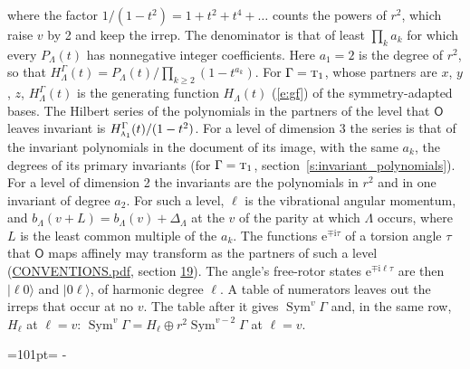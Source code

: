 \documentclass[10pt,a4paper]{article}
\newcommand{\needspace}[1]{\par\penalty-100\begingroup\dimen0=#1\relax\dimen2=\pagegoal
  \advance\dimen2-\pagetotal\ifdim\dimen0>\dimen2\relax\ifdim\dimen2>0pt\vfil\break\fi\fi
  \endgroup}
\numberwithin{equation}{section}
\newcommand{\grp}[1]{\mathsf{#1}}
\newcommand{\irr}[1]{\text{\normalfont\scshape #1}}
\newcommand{\iunit}{\mathrm{i}}
\newcommand{\expe}{\mathrm{e}}
\newcommand{\occ}[1]{\lvert #1\rangle}
\begin{document}
where the factor $1/(1 - t^2) = 1 + t^2 + t^4 + \dots$ counts the powers of $r^2$, which raise $v$ by 2 and keep the irrep. The denominator is that of least $\prod_k a_k$ for which every $P_\Lambda(t)$ has nonnegative integer coefficients. Here $a_1 = 2$ is the degree of $r^2$, so that $H^{\Gamma}_\Lambda(t) = P_\Lambda(t)/\prod_{k\ge2}(1 - t^{a_k})$. For $\Gamma = \irr{t}_{1}$, whose partners are $x$, $y$, $z$, $H^{\Gamma}_\Lambda(t)$ is the generating function $H_\Lambda(t)$ (\ref{e:gf}) of the symmetry-adapted bases. The Hilbert series of the polynomials in the partners of the level that $\grp{O}$ leaves invariant is $H^{\Gamma}_{\irr{a}_{1}}(t)/(1 - t^2)$. For a level of dimension 3 the series is that of the invariant polynomials in the document of its image, with the same $a_k$, the degrees of its primary invariants (for $\Gamma = \irr{t}_{1}$, section~\ref{s:invariant_polynomials}). For a level of dimension 2 the invariants are the polynomials in $r^2$ and in one invariant of degree $a_2$. \label{n:index.overtone.period}\label{n:index.increment.unitary}For such a level, $\ell$ is the vibrational angular momentum, and $b_\Lambda(v + L) = b_\Lambda(v) + \Delta_\Lambda$ at the $v$ of the parity at which $\Lambda$ occurs, where $L$ is the least common multiple of the $a_k$. \label{n:local.torsion.angle}The functions $\expe^{\mp\iunit\tau}$ of a torsion angle $\tau$ that $\grp{O}$ maps affinely may transform as the partners of such a level (\href{../../CONVENTIONS.pdf}{CONVENTIONS.pdf}, section \href{../../CONVENTIONS.pdf\#conv.19}{19}). The angle's free-rotor states $\expe^{\mp\iunit\ell\tau}$ are then $\occ{\ell 0}$ and $\occ{0 \ell}$, of harmonic degree $\ell$. A table of numerators leaves out the irreps that occur at no $v$. The table after it gives $\operatorname{Sym}^{v}\Gamma$ and, in the same row, $H_\ell$ at $\ell = v$: $\operatorname{Sym}^{v}\Gamma = H_\ell \oplus r^2\operatorname{Sym}^{v-2}\Gamma$ at $\ell = v$.
\needspace{101pt}
\end{document}
